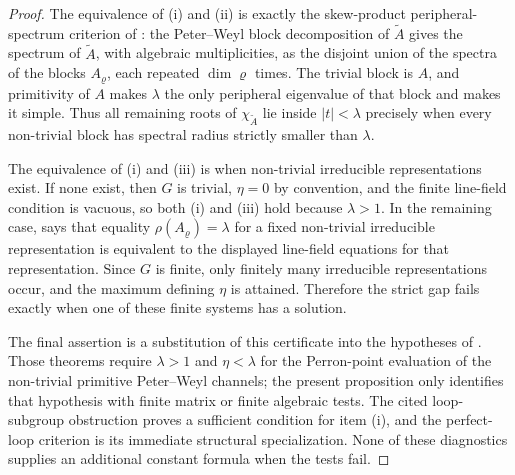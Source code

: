 \documentclass[11pt,a4paper]{amsart}
\theoremstyle{plain}
\theoremstyle{definition}
\theoremstyle{remark}
\begin{document}
\begin{proof}
  The equivalence of \rm(i) and \rm(ii) is exactly the skew-product
  peripheral-spectrum criterion of
  : the Peter--Weyl block
  decomposition of \(\widetilde A\) gives the spectrum of
  \(\widetilde A\), with algebraic multiplicities, as the disjoint union
  of the spectra of the blocks \(A_\varrho\), each repeated
  \(\dim\varrho\) times. The trivial block is \(A\), and primitivity of
  \(A\) makes \(\lambda\) the only peripheral eigenvalue of that block and
  makes it simple. Thus all remaining roots of
  \(\chi_{\widetilde A}\) lie inside \(|t|<\lambda\) precisely when every
  non-trivial block has spectral radius strictly smaller than \(\lambda\).

  The equivalence of \rm(i) and \rm(iii) is
   when non-trivial irreducible
  representations exist. If none exist, then \(G\) is trivial, \(\eta=0\)
  by convention, and the finite line-field condition is vacuous, so both
  \rm(i) and \rm(iii) hold because \(\lambda>1\). In the remaining case,
   says that equality
  \(\rho(A_\varrho)=\lambda\) for a fixed non-trivial irreducible
  representation is equivalent to the displayed line-field equations for
  that representation. Since \(G\) is finite, only finitely many
  irreducible representations occur, and the maximum defining \(\eta\) is
  attained. Therefore the strict gap fails exactly when one of these
  finite systems has a solution.

  The final assertion is a substitution of this certificate into the
  hypotheses of
  . Those
  theorems require \(\lambda>1\) and \(\eta<\lambda\) for the Perron-point
  evaluation of the non-trivial primitive Peter--Weyl channels; the present
  proposition only identifies that hypothesis with finite matrix or
  finite algebraic tests.  The cited loop-subgroup obstruction proves a
  sufficient condition for item \rm(i), and the perfect-loop criterion is
  its immediate structural specialization.  None of these diagnostics
  supplies an additional constant formula when the tests fail.
\end{proof}
\end{document}
